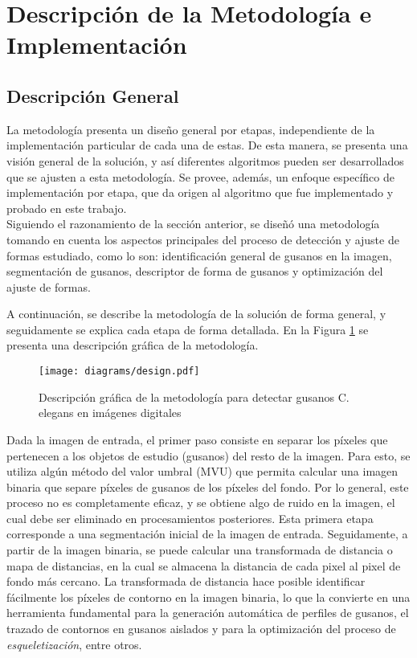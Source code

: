 \section{Descripci\'on de la Metodolog\'ia e Implementaci\'on}
\label{met:description}

\subsection{Descripci\'on General}

La metodolog\'ia presenta un dise\~no general por etapas, 
independiente de la implementaci\'on particular de cada una de estas. De esta
manera, se presenta una visi\'on general de la soluci\'on, y as\'i diferentes
algoritmos pueden ser desarrollados que se ajusten a esta metodolog\'ia.
Se provee, adem\'as, un enfoque espec\'ifico de implementaci\'on por etapa, que da
origen al algoritmo que fue implementado y probado en este trabajo.\\

Siguiendo el razonamiento de la secci\'on anterior, se dise\~n\'o una metodolog\'ia tomando en cuenta
los aspectos principales del proceso de detecci\'on y ajuste de formas estudiado, como lo son:
identificaci\'on general de gusanos en la imagen, segmentaci\'on de gusanos, 
descriptor de forma de gusanos y optimizaci\'on del ajuste de formas.

A continuaci\'on, se describe la metodolog\'ia de la soluci\'on de forma general,  y
seguidamente se explica cada etapa de forma detallada.
En la Figura \ref{fig:methsol} se presenta una descripci\'on gr\'afica de la metodolog\'ia.\\

\begin{figure}[h t b p ! H]
 \centering
   \texttt{[image: diagrams/design.pdf]}
 \caption{Descripci\'on gr\'afica de la metodolog\'ia para detectar gusanos C. elegans
   en im\'agenes digitales}
\label{fig:methsol}
\end{figure}

Dada la imagen de entrada, el primer paso consiste en separar los p\'ixeles que
pertenecen a los objetos de estudio (gusanos) del resto de la imagen. Para esto,
se utiliza alg\'un m\'etodo del valor umbral (MVU) que permita calcular una imagen
binaria que separe p\'ixeles de gusanos de los p\'ixeles del fondo. Por lo general,
este proceso no es completamente eficaz, y se obtiene algo de ruido en la imagen, el
cual debe ser eliminado en procesamientos posteriores. Esta primera etapa corresponde
a una segmentaci\'on inicial de la imagen de entrada.
Seguidamente, a partir de la imagen binaria, se puede calcular una transformada de
distancia o mapa de distancias, en la cual se almacena la distancia de cada pixel
al pixel de fondo m\'as cercano. La transformada de distancia hace posible identificar
f\'acilmente los p\'ixeles de contorno en la imagen binaria, lo que la convierte en
una herramienta fundamental para la generaci\'on autom\'atica de perfiles de gusanos,
el trazado de contornos en gusanos aislados y para la optimizaci\'on del proceso
de \emph{esqueletizaci\'on}, entre otros. \\

